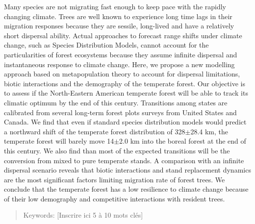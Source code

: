\abstract
\begin{singlespace}

  Many species are not migrating fast enough to keep pace with the rapidly changing climate. Trees are well known to experience long time lags in their migration responses because they are sessile, long-lived and have a relatively short dispersal ability. Actual approaches to forecast range shifts under climate change, such as Species Distribution Models, cannot account for the particularities of forest ecosystems because they assume infinite dispersal and instantaneous response to climate change. Here, we propose a new modelling approach based on metapopulation theory to account for dispersal limitations, biotic interactions and the demography of the temperate forest. Our objective is to assess if the North-Eastern American temperate forest will be able to track its climatic optimum by the end of this century. Transitions among states are calibrated from several long-term forest plots surveys from United States and Canada. We find that even if standard species distribution models would predict a northward shift of the temperate forest distribution of 328$\pm$28.4 km, the temperate forest will barely move 14$\pm$2.0 km into the boreal forest at the end of this century. We also find than most of the expected transitions will be the conversion from mixed to pure temperate stands. A comparison with an infinite dispersal scenario reveals that biotic interactions and stand replacement dynamics are the most significant factors limiting migration rate of forest trees. We conclude that the temperate forest has a low resilience to climate change because of their low demography and competitive interactions with resident trees.

  \begin{quote}
    Keywords: [Inscrire ici 5 à 10 mots clés]
  \end{quote}
\end{singlespace}
\cleardoublepage


\tabledesmatieres


\listedestableaux


\listedesfigures



\cleardoublepage
